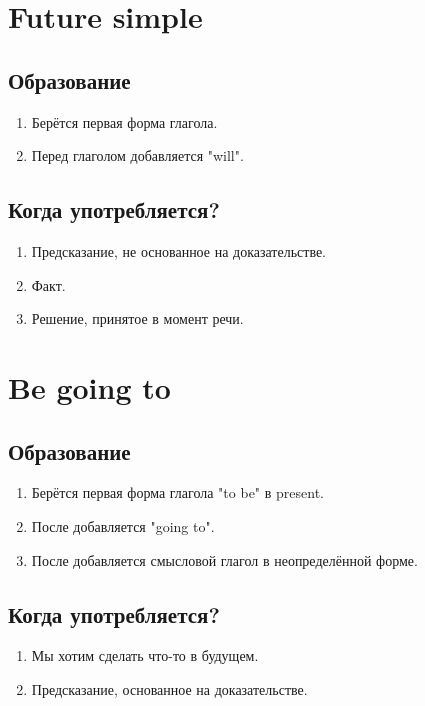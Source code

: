 \documentclass[oneside]{book}
\begin{document}
	\section{Future simple}
	\subsection{Образование}
	\begin{enumerate}
		\item Берётся первая форма глагола.
		\item Перед глаголом добавляется "will".
	\end{enumerate}

	\subsection{Когда употребляется?}
	\begin{enumerate}
		\item Предсказание, не основанное на доказательстве.
		\item Факт.
		\item Решение, принятое в момент речи.
	\end{enumerate}

	\section{Be going to}
	\subsection{Образование}
	\begin{enumerate}
		\item Берётся первая форма глагола "to be" в present.
		\item После добавляется "going to".
		\item После добавляется смысловой глагол в неопределённой форме.
	\end{enumerate}

	\subsection{Когда употребляется?}
	\begin{enumerate}
		\item Мы хотим сделать что-то в будущем.
		\item Предсказание, основанное на доказательстве.
	\end{enumerate}
\end{document}
